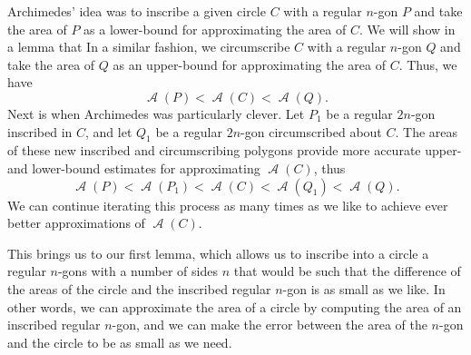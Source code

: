 \documentclass[letterpaper, 12pt]{amsart}
\DeclareMathOperator{\A}{\mathcal{A}}
\theoremstyle{definition}  %
\begin{document}
		Archimedes' idea was to inscribe a given circle $C$ with a regular $n$-gon $P$ and take the area of $P$ as a lower-bound for approximating the area of $C$.
		We will show in a lemma that 
		In a similar fashion, we circumscribe $C$ with a regular $n$-gon $Q$ and take the area of $Q$ as an upper-bound for approximating the area of $C$.
		Thus, we have $$\A(P) < \A(C) < \A(Q).$$
		Next is when Archimedes was particularly clever.
		Let $P_{1}$ be a regular $2n$-gon inscribed in $C$, and let $Q_{1}$ be a regular $2n$-gon circumscribed about $C$.
		The areas of these new inscribed and circumscribing polygons provide more accurate upper- and lower-bound estimates for approximating $\A(C)$, thus $$\A(P) < \A(P_{1}) < \A(C) < \A(Q_{1}) < \A(Q).$$
		We can continue iterating this process as many times as we like to achieve ever better approximations of $\A(C)$.

		\vspace{5mm}

		This brings us to our first lemma, which allows us to inscribe into a circle a regular $n$-gons with a number of sides $n$ that would be such that the difference of the areas of the circle and the inscribed regular $n$-gon is as small as we like.
		In other words, we can approximate the area of a circle by computing the area of an inscribed regular $n$-gon, and we can make the error between the area of the $n$-gon and the circle to be as small as we need.
\end{document}
